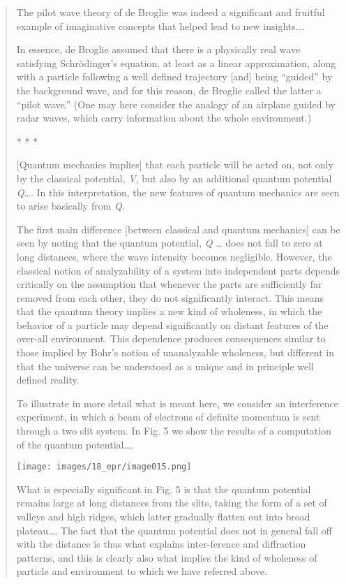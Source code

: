 \documentclass[11pt]{memoir}
\begin{document}
\begin{quote}
The pilot wave theory of de Broglie was indeed a significant and
fruitful example of imaginative concepts that helped lead to new
insights\ldots.

In essence, de Broglie assumed that there is a physically real wave
satisfying Schrödinger's equation, at least as a linear approximation,
along with a particle following a well defined trajectory {[}and{]}
being ``guided'' by the background wave, and for this reason, de Broglie
called the latter a ``pilot wave.'' (One may here consider the analogy
of an airplane guided by radar waves, which carry information about the
whole environment.)\\
\centerline{* * *}

{[}Quantum mechanics implies{]} that each particle will be acted on, not
only by the classical potential, \emph{V}, but also by an additional
quantum potential \emph{Q}\ldots. In this interpretation, the new
features of quantum mechanics are seen to arise basically from \emph{Q.}

The first main difference {[}between classical and quantum mechanics{]}
can be seen by noting that the quantum potential, \emph{Q} \ldots{} does
not fall to zero at long distances, where the wave intensity becomes
negligible. However, the classical notion of analyzability of a system
into independent parts depends critically on the assumption that
whenever the parts are sufficiently far removed from each other, they do
not significantly interact. This means that the quantum theory implies a
new kind of wholeness, in which the behavior of a particle may depend
significantly on distant features of the over-all environment. This
dependence produces consequences similar to those implied by Bohr's
notion of unanalyzable wholeness, but different in that the universe can
be understood as a unique and in principle well defined reality.

To illustrate in more detail what is meant here, we consider an
interference experiment, in which a beam of electrons of definite
momentum is sent through a two slit system. In Fig. 5 we show the
results of a computation of the quantum potential\ldots.


\begin{center}
  \texttt{[image: images/18\_epr/image015.png]}
\end{center}

What is especially significant in Fig. 5 is that the quantum potential
remains large at long distances from the slits, taking the form of a set
of valleys and high ridges, which latter gradually flatten out into
broad plateau\ldots. The fact that the quantum potential does not in
general fall off with the distance is thus what explains inter-ference
and diffraction patterns, and this is clearly
also what implies the kind of wholeness of particle and environment to which
we have referred above.



\end{quote}
\end{document}
